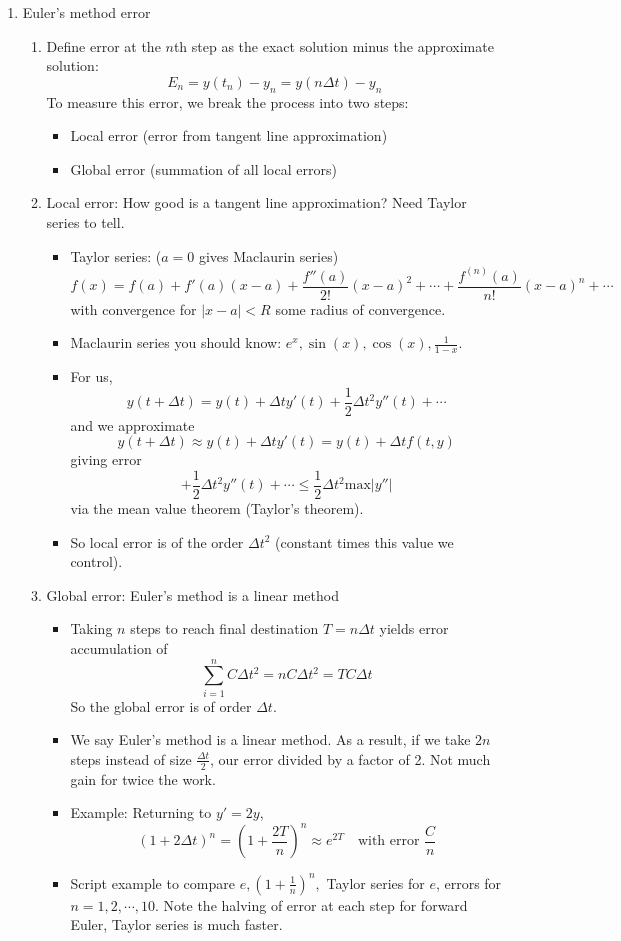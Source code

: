 \documentclass{article}
\newcommand{\ds}{\displaystyle}
\begin{document}
\begin{enumerate}
\item Euler's method error
\begin{enumerate}
\item Define error at the $n$th step as the exact solution minus the approximate solution:
\[
E_n = y(t_n)-y_n = y(n\Delta t)-y_n
\]
To measure this error, we break the process into two steps:
\begin{itemize}
\item Local error (error from tangent line approximation)
\item Global error (summation of all local errors)
\end{itemize}
\item Local error: How good is a tangent line approximation? Need Taylor series to tell.
\begin{itemize}
\item Taylor series: ($a=0$ gives Maclaurin series)
\[
f(x) = f(a) + f'(a)(x-a) + \frac{f''(a)}{2!}(x-a)^2+\cdots+\frac{f^{(n)}(a)}{n!}(x-a)^n +\cdots
\]
with convergence for $|x-a|<R$ some radius of convergence.
\item Maclaurin series you should know: $\ds e^x, \sin(x), \cos(x), \frac{1}{1-x}$. 
\item For us, 
\[
y(t+\Delta t) = y(t) + \Delta t y'(t) + \frac{1}{2} \Delta t^2 y''(t) +\cdots
\]
and we approximate
\[
y(t+\Delta t) \approx y(t) + \Delta t y'(t) = y(t) + \Delta t f(t,y)
\]
giving error 
\[
+ \frac{1}{2} \Delta t^2 y''(t) +\cdots \leq \frac{1}{2} \Delta t^2 \text{max}|y''|
\]
via the mean value theorem (Taylor's theorem). 
\item So local error is of the order $\Delta t^2$ (constant times this value we control). 
\end{itemize}
\item Global error: Euler's method is a linear method
\begin{itemize}
\item Taking $n$ steps to reach final destination $T=n\Delta t$ yields error accumulation of 
\[
\sum_{i=1}^n C \Delta t^2 = nC\Delta t^2 = TC \Delta t
\]
So the global error is of order $\Delta t$.
\item We say Euler's method is a linear method. As a result, if we take $2n$ steps instead of size $\frac{\Delta t}{2}$, our error divided by a factor of 2. Not much gain for twice the work.
\item Example: Returning to $y'=2y$, 
\[
\left(1+2\Delta t\right)^n = \left(1+\frac{2T}{n}\right)^n \approx e^{2T} \quad \text{with error $\frac{C}{n}$}
\]
\item Script example to compare $e, \left(1+\frac{1}{n}\right)^n,$ Taylor series for $e$, errors for $n=1,2,\cdots, 10$. Note the halving of error at each step for forward Euler, Taylor series is much faster.
\end{itemize}
\end{enumerate}


\end{enumerate}
\end{document}
